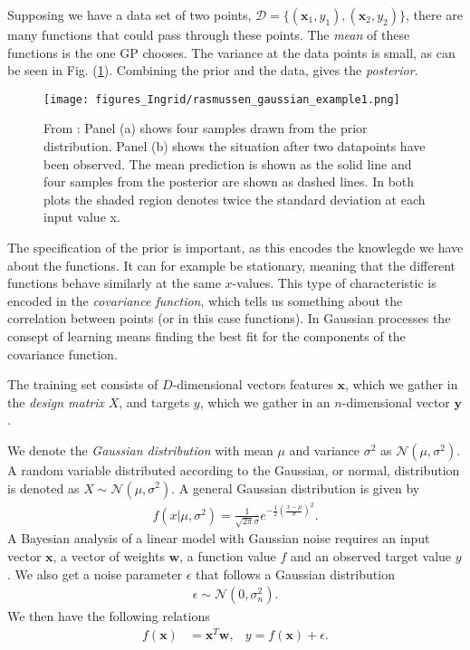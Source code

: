 \documentclass[twoside,english]{uiofysmaster}
\begin{document}
Supposing we have a data set of two points, $\mathcal{D} = \{(\textbf{x}_1,y_1), (\textbf{x}_2,y_2)\}$, there are many functions that could pass through these points. The \textit{mean} of these functions is the one GP chooses. The variance at the data points is small, as can be seen in Fig. (\ref{Fig:: Gaussian function example 2 points}). Combining the prior and the data, gives the \textit{posterior}.


\begin{figure}[H]
\label{Fig:: Gaussian function example 2 points}
\centering
\texttt{[image: figures\_Ingrid/rasmussen\_gaussian\_example1.png]}
\caption{From \cite{rasmussen2006gaussian}: Panel (a) shows four samples drawn from the prior distribution. Panel
(b) shows the situation after two datapoints have been observed. The mean prediction
is shown as the solid line and four samples from the posterior are shown as dashed
lines. In both plots the shaded region denotes twice the standard deviation at each
input value x.}
\end{figure}


The specification of the prior is important, as this encodes the knowlegde we have about the functions. It can for example be stationary, meaning that the different functions behave similarly at the same $x$-values. This type of characteristic is encoded in the \textit{covariance function}, which tells us something about the correlation between points (or in this case functions). In Gaussian processes the consept of learning means finding the best fit for the components of the covariance function.

The training set consists of $D$-dimensional vectors features $\textbf{x}$, which we gather in the \textit{design matrix} $X$, and targets $y$, which we gather in an $n$-dimensional vector $\textbf{y}$.

We denote the \textit{Gaussian distribution} with mean $\mu$ and variance $\sigma^2$ as $\mathcal{N}(\mu, \sigma^2)$. A random variable distributed according to the Gaussian, or normal, distribution is denoted as $X \sim \mathcal{N}(\mu, \sigma^2)$. A general Gaussian distribution is given by
\begin{align}\label{Eq:: General Gaussian Distribution}
f(x|\mu, \sigma^2) = \frac{1}{\sqrt{2 \pi} \sigma} e^{-\frac{1}{2} (\frac{x-\mu}{\sigma})^2}.
\end{align}
A Bayesian analysis of a linear model with Gaussian noise requires an input vector $\textbf{x}$, a vector of weights $\textbf{w}$, a function value $f$ and an observed target value $y$. We also get a noise parameter $\epsilon$ that follows a Gaussian distribution
\begin{align}\label{Eq:: Gaussian dist noise}
\epsilon \sim \mathcal{N}(0, \sigma_n^2).
\end{align}
We then have the following relations
\begin{align}\label{Eq:: Gaussian linear w noise}
f(\textbf{x}) &= \textbf{x}^T \textbf{w}, &y = f(\textbf{x}) + \epsilon.
\end{align}
\end{document}
